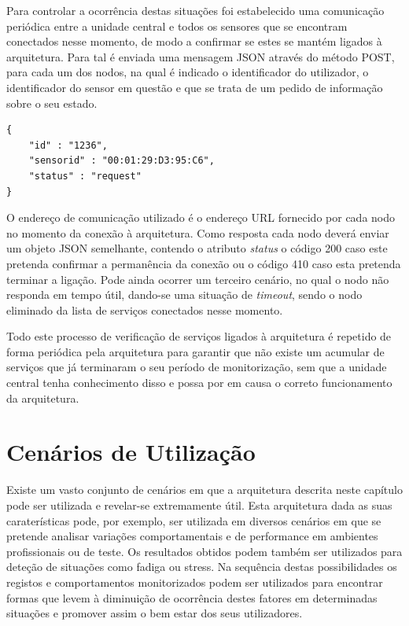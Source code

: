 Para controlar a ocorrência destas situações foi estabelecido uma comunicação periódica entre a unidade central e todos os sensores que se encontram conectados nesse momento, de modo a confirmar se estes se mantém ligados à arquitetura. Para tal é enviada uma mensagem JSON através do método POST, para cada um dos nodos, na qual é indicado o identificador do utilizador, o identificador do sensor em questão e que se trata de um pedido de informação sobre o seu estado.\\

\begin{lstlisting}[caption=Mensagem de verificação de estado de um nodo]
{
	"id" : "1236",
  	"sensorid" : "00:01:29:D3:95:C6",
	"status" : "request"
}

\end{lstlisting}

O endereço de comunicação utilizado é o endereço URL fornecido por cada nodo no momento da conexão à arquitetura. Como resposta cada nodo deverá enviar um objeto JSON semelhante, contendo o atributo \textit{status} o código 200 caso este pretenda confirmar a permanência da conexão ou o código 410 caso esta pretenda terminar a ligação. Pode ainda ocorrer um terceiro cenário, no qual o nodo não responda em tempo útil, dando-se uma situação de \textit{timeout}, sendo o nodo eliminado da lista de serviços conectados nesse momento.

Todo este processo de verificação de serviços ligados à arquitetura é repetido de forma periódica pela arquitetura para garantir que não existe um acumular de serviços que já terminaram o seu período de monitorização, sem que a unidade central tenha conhecimento disso e possa por em causa o correto funcionamento da arquitetura.

\section{Cenários de Utilização}

Existe um vasto conjunto de cenários em que a arquitetura descrita neste capítulo pode ser utilizada e revelar-se extremamente útil. Esta arquitetura dada as suas caraterísticas pode, por exemplo, ser utilizada em diversos cenários em que se pretende analisar variações comportamentais e de performance em ambientes profissionais ou de teste. Os resultados obtidos podem também ser utilizados para deteção de situações como fadiga ou stress. Na sequência destas possibilidades os registos e comportamentos monitorizados podem ser utilizados para encontrar formas que levem à diminuição de ocorrência destes fatores em determinadas situações e promover assim o bem estar dos seus utilizadores.

